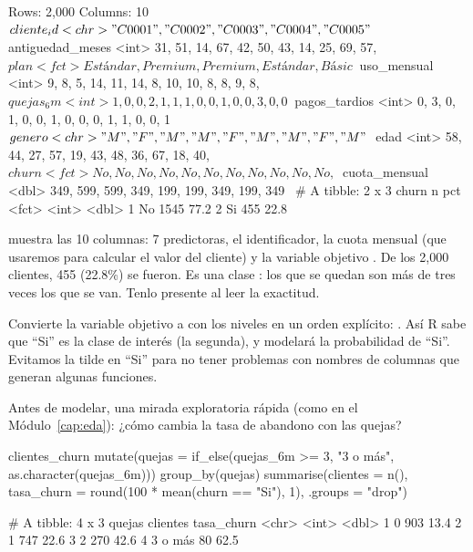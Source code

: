 \begin{rsalida}
Rows: 2,000
Columns: 10
$ cliente_id       <chr> "C0001", "C0002", "C0003", "C0004", "C0005"~
$ antiguedad_meses <int> 31, 51, 14, 67, 42, 50, 43, 14, 25, 69, 57,~
$ plan             <fct> Estándar, Premium, Premium, Estándar, Básic~
$ uso_mensual      <int> 9, 8, 5, 14, 11, 14, 8, 10, 10, 8, 8, 9, 8,~
$ quejas_6m        <int> 1, 0, 0, 2, 1, 1, 1, 0, 0, 1, 0, 0, 3, 0, 0~
$ pagos_tardios    <int> 0, 3, 0, 1, 0, 0, 1, 0, 0, 0, 1, 1, 0, 0, 1~
$ genero           <chr> "M", "F", "M", "M", "F", "M", "M", "F", "M"~
$ edad             <int> 58, 44, 27, 57, 19, 43, 48, 36, 67, 18, 40,~
$ churn            <fct> No, No, No, No, No, No, No, No, No, No, No,~
$ cuota_mensual    <dbl> 349, 599, 599, 349, 199, 199, 349, 199, 349~
# A tibble: 2 x 3
  churn     n   pct
  <fct> <int> <dbl>
1 No     1545  77.2
2 Si      455  22.8
\end{rsalida}

 muestra las 10 columnas: 7 predictoras, el identificador,
la cuota mensual (que usaremos para calcular el valor del cliente) y la
variable objetivo . De los 2{,}000 clientes, 455 (22.8\%) se
fueron. Es una clase : los que se quedan son más de
tres veces los que se van. Tenlo presente al leer la exactitud.

\begin{consejo}
Convierte la variable objetivo a  con los niveles en un orden
explícito: . Así R sabe que ``Si'' es la clase
de interés (la segunda), y  modelará la probabilidad de ``Si''.
Evitamos la tilde en ``Si'' para no tener problemas con nombres de columnas que
generan algunas funciones.
\end{consejo}

Antes de modelar, una mirada exploratoria rápida (como en el
Módulo~\ref{cap:eda}): ¿cómo cambia la tasa de abandono con las quejas?

\begin{rcode}
clientes_churn %
  mutate(quejas = if_else(quejas_6m >= 3, "3 o más",
                          as.character(quejas_6m))) %
  group_by(quejas) %
  summarise(clientes = n(),
            tasa_churn = round(100 * mean(churn == "Si"), 1),
            .groups = "drop")
\end{rcode}

\begin{rsalida}
# A tibble: 4 x 3
  quejas  clientes tasa_churn
  <chr>      <int>      <dbl>
1 0            903       13.4
2 1            747       22.6
3 2            270       42.6
4 3 o más       80       62.5
\end{rsalida}

